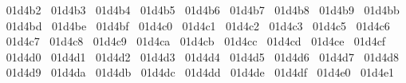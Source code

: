 {  ^^^^^^01d4b2%
  ^^^^^^01d4b3%
  ^^^^^^01d4b4%
  ^^^^^^01d4b5%
  ^^^^^^01d4b6%
  ^^^^^^01d4b7%
  ^^^^^^01d4b8%
  ^^^^^^01d4b9%
  ^^^^^^01d4bb%
  ^^^^^^01d4bd%
  ^^^^^^01d4be%
  ^^^^^^01d4bf%
  ^^^^^^01d4c0%
  ^^^^^^01d4c1%
  ^^^^^^01d4c2%
  ^^^^^^01d4c3%
  ^^^^^^01d4c5%
  ^^^^^^01d4c6%
  ^^^^^^01d4c7%
  ^^^^^^01d4c8%
  ^^^^^^01d4c9%
  ^^^^^^01d4ca%
  ^^^^^^01d4cb%
  ^^^^^^01d4cc%
  ^^^^^^01d4cd%
  ^^^^^^01d4ce%
  ^^^^^^01d4cf%
  ^^^^^^01d4d0%
  ^^^^^^01d4d1%
  ^^^^^^01d4d2%
  ^^^^^^01d4d3%
  ^^^^^^01d4d4%
  ^^^^^^01d4d5%
  ^^^^^^01d4d6%
  ^^^^^^01d4d7%
  ^^^^^^01d4d8%
  ^^^^^^01d4d9%
  ^^^^^^01d4da%
  ^^^^^^01d4db%
  ^^^^^^01d4dc%
  ^^^^^^01d4dd%
  ^^^^^^01d4de%
  ^^^^^^01d4df%
  ^^^^^^01d4e0%
  ^^^^^^01d4e1%
}
